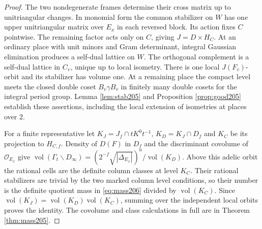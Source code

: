 \documentclass[a4paper,11pt]{article}
\theoremstyle{definition}
\theoremstyle{remark}
\numberwithin{equation}{section}
\begin{document}
\begin{proof}
The two nondegenerate frames determine their cross matrix up to
unitriangular changes. In monomial form the common stabilizer on
\(W\) has one upper unitriangular matrix over \(E_x\) in each
reversed block. Its action fixes \(C\) pointwise. The remaining
factor acts only on \(C\), giving \(J=D\times H_C\).
At an ordinary place with unit minors and Gram determinant, integral
Gaussian elimination produces a self-dual lattice on \(W\). The
orthogonal complement is a self-dual lattice in \(C_v\), unique up
to local isometry. There is one local \(J(F_v)\)-orbit and its
stabilizer has volume one. At a remaining place the compact level
meets the closed double coset \(B_v\gamma B_v\) in finitely many
double cosets for the integral period group.
Lemma \ref{lem:stab205} and Proposition \ref{prop:good205} establish these assertions, including the local
extension of isometries at places over \(2\).

For a finite representative let \(K_J=J_f\cap tK^0t^{-1}\),
\(K_D=K_J\cap D_f\) and \(K_C\) be its projection to \(H_{C,f}\).
Density of \(D(F)\) in \(D_f\) and the discriminant covolume of
\(\mathcal O_{E_x}\) give
\(\operatorname{vol}(\Gamma_t\backslash D_\infty)
=(2^{-f}\sqrt{|\Delta_{E_x}|})^a/\operatorname{vol}(K_D)\).
Above this adelic orbit the rational cells are the definite
column classes at level \(K_C\). Their rational stabilizers
are trivial by the two marked column level conditions, so their
number is the definite quotient mass in \eqref{eq:mass206}
divided by \(\operatorname{vol}(K_C)\). Since
\(\operatorname{vol}(K_J)=\operatorname{vol}(K_D)\operatorname{vol}(K_C)\),
summing over the independent local orbits proves the identity.
The covolume and class calculations in full are in
Theorem \ref{thm:mass205}.
\end{proof}
\end{document}
